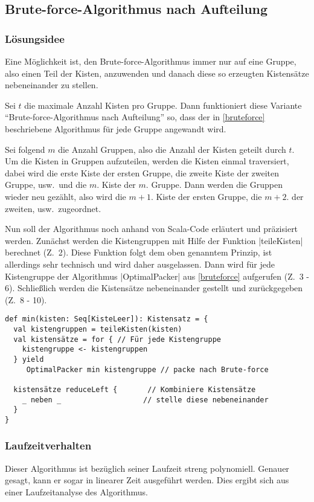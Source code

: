 \subsection{Brute-force-Algorithmus nach Aufteilung}
\label{auf}
\subsubsection{Lösungsidee}
 Eine Möglichkeit ist, den Brute-force-Algorithmus immer nur auf eine Gruppe,
  also einen Teil der Kisten, anzuwenden und danach diese so erzeugten Kistensätze nebeneinander zu stellen.
 
 Sei $t$ die maximale Anzahl Kisten pro Gruppe.
 Dann funktioniert diese Variante ``Brute-force-Al\-go\-rith\-mus nach Aufteilung'' so,
 dass der in \ref{bruteforce} beschriebene Algorithmus für jede Gruppe angewandt wird.

 Sei folgend $m$ die Anzahl Gruppen, also die Anzahl der Kisten geteilt durch $t$.
 Um die Kisten in Gruppen aufzuteilen, werden die Kisten einmal traversiert,
 dabei wird die erste Kiste der ersten Gruppe, die zweite Kiste der zweiten Gruppe, usw.\ und die $m.$ Kiste der $m.$ Gruppe.
 Dann werden die Gruppen wieder neu gezählt, also wird die $m+1.$ Kiste der ersten Gruppe, die $m+2.$ der zweiten, usw.\ zugeordnet.

 Nun soll der Algorithmus noch anhand von Scala-Code erläutert und präzisiert werden.
 Zunächst werden die Kistengruppen mit Hilfe der Funktion |teileKisten| berechnet (Z.\ 2).
 Diese Funktion folgt dem oben genanntem Prinzip, ist allerdings sehr technisch und wird daher ausgelassen.
 Dann wird für jede Kistengruppe der Algorithmus |OptimalPacker| aus \ref{bruteforce} aufgerufen (Z.\ 3 - 6).
 Schließlich werden die Kistensätze nebeneinander gestellt und zurückgegeben (Z.\ 8 - 10).
\begin{lstlisting}
def min(kisten: Seq[KisteLeer]): Kistensatz = {
  val kistengruppen = teileKisten(kisten)
  val kistensätze = for { // Für jede Kistengruppe
    kistengruppe <- kistengruppen
  } yield
     OptimalPacker min kistengruppe // packe nach Brute-force
  
  kistensätze reduceLeft {       // Kombiniere Kistensätze
    _ neben _                   // stelle diese nebeneinander
  }
}
\end{lstlisting}

\subsubsection{Laufzeitverhalten}
 Dieser Algorithmus ist bezüglich seiner Laufzeit streng polynomiell. Genauer gesagt, kann er sogar in linearer Zeit ausgeführt werden.
 Dies ergibt sich aus einer Laufzeitanalyse des Algorithmus.

